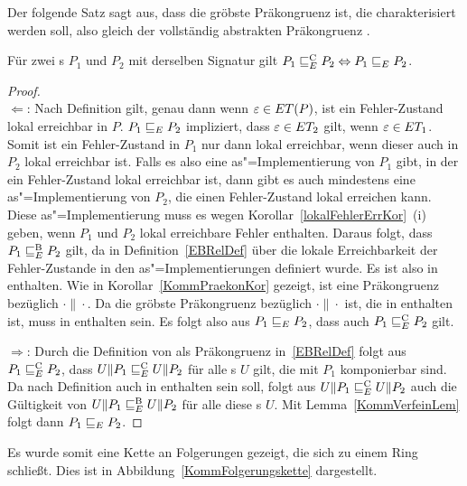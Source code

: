 Der folgende Satz sagt aus, dass \ERel{} die gröbste Präkongruenz ist, die
charakterisiert werden soll, also gleich der vollständig abstrakten
Präkongruenz \ECRel{}.

\begin{Satz}
  \label{KommVollAbstraktSatz}
  Für zwei \MEIO{}s $P_1$ und $P_2$ mit derselben Signatur gilt $P_1 \sqsubseteq  _E^\mathrm{C}
  P_2\Leftrightarrow P_1 \sqsubseteq  _E{} P_2$.
\end{Satz}
\begin{proof}\mbox{}\\
  \glqq$\Leftarrow$\grqq: Nach Definition gilt, genau dann wenn
  $\varepsilon\in ET (P)$, ist ein Fehler-Zustand lokal erreichbar in $P$. $P_1
   \sqsubseteq  _E P_2$ impliziert, dass $\varepsilon\in ET _2$ gilt, wenn
  $\varepsilon\in ET _1$. Somit ist ein Fehler-Zustand in $P_1$ nur dann lokal
  erreichbar, wenn dieser auch in $P_2$ lokal erreichbar ist. Falls es also
  eine as"=Implementierung von $P_1$ gibt, in der ein Fehler-Zustand lokal
  erreichbar ist, dann gibt es auch mindestens eine as"=Implementierung von
  $P_2$, die einen Fehler-Zustand lokal erreichen kann. Diese
  as"=Implementierung muss es wegen Korollar~\ref{lokalFehlerErrKor}~(i) geben,
  wenn $P_1$ und $P_2$ lokal erreichbare Fehler enthalten. Daraus folgt, dass
  $P_1 \sqsubseteq  _E^\mathrm{B} P_2$ gilt, da \EBRel{} in Definition~\ref{EBRelDef} über die
  lokale Erreichbarkeit der Fehler-Zustande in den as"=Implementierungen
  definiert wurde. Es ist also \ERel{} in \EBRel{} enthalten. Wie in
  Korollar~\ref{KommPraekonKor} gezeigt, ist \ERel{} eine Präkongruenz
  bezüglich $\cdot\|\cdot$. Da \ECRel{} die gröbste Präkongruenz bezüglich
  $\cdot\|\cdot$ ist, die in \EBRel{} enthalten ist, muss \ERel{} in \ECRel{}
  enthalten sein. Es folgt also aus $P_1 \sqsubseteq  _E P_2$, dass auch $P_1 \sqsubseteq  _E^\mathrm{C} P_2$
  gilt.

  \glqq$\Rightarrow$\grqq: Durch die Definition von \ECRel{} als Präkongruenz
  in~\ref{EBRelDef} folgt aus $P_1 \sqsubseteq  _E^\mathrm{C}{} P_2$, dass $U\|P_1 \sqsubseteq  _E^\mathrm{C} U\|P_2$ für
  alle \MEIO{}s $U$ gilt, die mit $P_1$ komponierbar sind. Da \ECRel{} nach
  Definition auch in \EBRel{} enthalten sein soll, folgt aus $U\|P_1 \sqsubseteq  _E^\mathrm{C}{}
  U\|P_2$ auch die Gültigkeit von $U\|P_1 \sqsubseteq  _E^\mathrm{B}{}U\|P_2$ für alle diese
  \MEIO{}s $U$. Mit Lemma~\ref{KommVerfeinLem} folgt dann $P_1 \sqsubseteq  _E{} P_2$.
\end{proof}

Es wurde somit eine Kette an Folgerungen gezeigt, die sich zu einem Ring
schließt. Dies ist in Abbildung~\ref{KommFolgerungskette} dargestellt.


